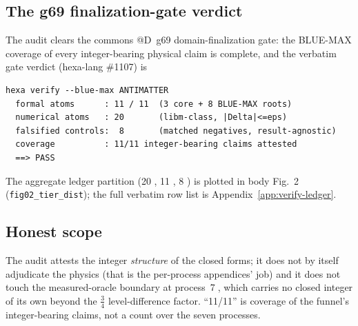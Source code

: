 \subsection{The g69 finalization-gate verdict}
\label{app:bm-gate}

The audit clears the commons @D~g69 domain-finalization gate: the BLUE-MAX
coverage of every integer-bearing physical claim is complete, and the
verbatim gate verdict (hexa-lang \#1107) is
\begin{lstlisting}
hexa verify --blue-max ANTIMATTER
  formal atoms      : 11 / 11  (3 core + 8 BLUE-MAX roots)
  numerical atoms   : 20       (libm-class, |Delta|<=eps)
  falsified controls:  8       (matched negatives, result-agnostic)
  coverage          : 11/11 integer-bearing claims attested
  ==> PASS
\end{lstlisting}
The aggregate ledger partition (20 \tierGreen, 11 \tierBlue, 8 \tierRed) is
plotted in body Fig.~2 (\texttt{fig02\_tier\_dist}); the full verbatim row
list is Appendix~\ref{app:verify-ledger}.

\subsection{Honest scope}
\label{app:bm-scope}

The audit attests the integer \emph{structure} of the closed forms; it does
not by itself adjudicate the physics (that is the per-process appendices'
job) and it does not touch the measured-oracle boundary at
process~\textcircled{\scriptsize 7}, which carries no closed integer of its own
beyond the $\tfrac34$ level-difference factor. ``11/11'' is coverage of the
funnel's integer-bearing claims, not a count over the seven processes.
